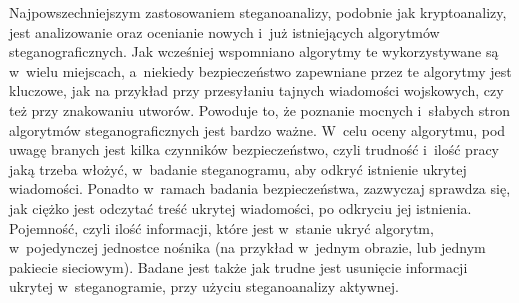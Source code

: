 \documentclass[a4paper, twoside, 12pt]{report}
\begin{document}
        Najpowszechniejszym zastosowaniem steganoanalizy, podobnie jak kryptoanalizy,
        jest analizowanie oraz ocenianie nowych i~już istniejących algorytmów steganograficznych.
        Jak wcześniej wspomniano algorytmy te wykorzystywane są w~wielu miejscach,
        a~niekiedy bezpieczeństwo zapewniane przez te algorytmy jest kluczowe, jak
        na przykład przy przesyłaniu tajnych wiadomości wojskowych, czy też przy znakowaniu
        utworów. Powoduje to, że poznanie mocnych i~słabych stron algorytmów steganograficznych
        jest bardzo ważne. W~celu oceny algorytmu, pod uwagę branych jest kilka czynników
        bezpieczeństwo, czyli trudność i~ilość pracy jaką trzeba włożyć,
        w~badanie steganogramu, aby odkryć istnienie ukrytej wiadomości.
        Ponadto w~ramach badania bezpieczeństwa, zazwyczaj sprawdza się, jak ciężko
        jest odczytać treść ukrytej wiadomości, po odkryciu jej istnienia.
        Pojemność, czyli
        ilość informacji, które jest w~stanie ukryć algorytm, w~pojedynczej jednostce
        nośnika (na przykład w~jednym obrazie, lub jednym pakiecie sieciowym). Badane
        jest także jak trudne jest usunięcie informacji ukrytej w~steganogramie, przy
        użyciu steganoanalizy aktywnej.
\end{document}
